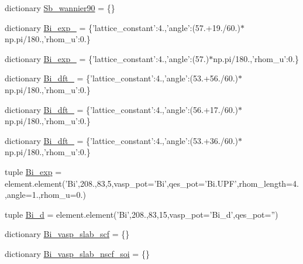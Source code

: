 \begin{DoxyCompactItemize}
\item 
dictionary \hyperlink{namespace_d_f_t___k_i_t_1_1apps_1_1bismuth__antimony_a0ea685695e01c80f5dce15e6982ed14d}{Sb\+\_\+wannier90} = \{\}
\item 
dictionary \hyperlink{namespace_d_f_t___k_i_t_1_1apps_1_1bismuth__antimony_a3897eb47b9a6eba72bc4280a6b6d41fd}{Bi\+\_\+exp\+\_} = \{'lattice\+\_\+constant'\+:4.,'angle'\+:(57.+19./60.)$\ast$np.\+pi/180.,'rhom\+\_\+u'\+:0.\}
\item 
dictionary \hyperlink{namespace_d_f_t___k_i_t_1_1apps_1_1bismuth__antimony_a2fc8afe0ae0f1828d58e0a064cd3a844}{Bi\+\_\+exp\+\_} = \{'lattice\+\_\+constant'\+:4.,'angle'\+:(57.)$\ast$np.\+pi/180.,'rhom\+\_\+u'\+:0.\}
\item 
dictionary \hyperlink{namespace_d_f_t___k_i_t_1_1apps_1_1bismuth__antimony_ad3ff489e1051aa82103c3da7dc7b6b5f}{Bi\+\_\+dft\+\_} = \{'lattice\+\_\+constant'\+:4.,'angle'\+:(53.+56./60.)$\ast$np.\+pi/180.,'rhom\+\_\+u'\+:0.\}
\item 
dictionary \hyperlink{namespace_d_f_t___k_i_t_1_1apps_1_1bismuth__antimony_af07069b59f7b4092160fafe6e87f7dc1}{Bi\+\_\+dft\+\_} = \{'lattice\+\_\+constant'\+:4.,'angle'\+:(56.+17./60.)$\ast$np.\+pi/180.,'rhom\+\_\+u'\+:0.\}
\item 
dictionary \hyperlink{namespace_d_f_t___k_i_t_1_1apps_1_1bismuth__antimony_a985fb7de2187991f21de822473d66fc5}{Bi\+\_\+dft\+\_} = \{'lattice\+\_\+constant'\+:4.,'angle'\+:(53.+36./60.)$\ast$np.\+pi/180.,'rhom\+\_\+u'\+:0.\}
\item 
tuple \hyperlink{namespace_d_f_t___k_i_t_1_1apps_1_1bismuth__antimony_a47d28bdcd6f82edb8765d6a4ca9654f7}{Bi\+\_\+exp} = element.\+element('Bi',208.,83,5,vasp\+\_\+pot='Bi',qes\+\_\+pot='Bi.\+U\+P\+F',rhom\+\_\+length=4.,angle=1.,rhom\+\_\+u=0.)
\item 
tuple \hyperlink{namespace_d_f_t___k_i_t_1_1apps_1_1bismuth__antimony_a09c7ba05ea616d81e4ba1eeec01e4fc0}{Bi\+\_\+d} = element.\+element('Bi',208.,83,15,vasp\+\_\+pot='Bi\+\_\+d',qes\+\_\+pot='')
\item 
dictionary \hyperlink{namespace_d_f_t___k_i_t_1_1apps_1_1bismuth__antimony_af1379b9e75a375b0b047a28c450c122c}{Bi\+\_\+vasp\+\_\+slab\+\_\+scf} = \{\}
\item 
dictionary \hyperlink{namespace_d_f_t___k_i_t_1_1apps_1_1bismuth__antimony_a564e9fe84c344988895e95377f1361a3}{Bi\+\_\+vasp\+\_\+slab\+\_\+nscf\+\_\+soi} = \{\}

\end{DoxyCompactItemize}
